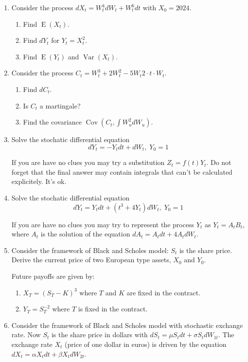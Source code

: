 \documentclass[12pt]{article}
\DeclareMathOperator{\Cov}{Cov}
\DeclareMathOperator{\Var}{Var}
\DeclareMathOperator{\E}{E}
\begin{document}
\begin{enumerate}

\item Consider the process $dX_t = W_t^4 dW_t + W_t^6 dt$ with $X_0 = 2024$.
\begin{enumerate}
  \item Find $\E(X_t)$.
  \item Find $dY_t$ for $Y_t = X_t^2$.
  \item Find $\E(Y_t)$ and $\Var(X_t)$.
\end{enumerate}

\item Consider the process $C_t = W_t^3 + 2W_t^2 - 5 W_t 2 \cdot t\cdot W_t$.
\begin{enumerate}
  \item Find $dC_t$. 
  \item Is $C_t$ a martingale?
  \item Find the covariance $\Cov(C_t, \int W^2_u dW_u)$.
\end{enumerate}

\item Solve the stochatic differential equation
\[
dY_t = - Y_t dt + dW_t, \; Y_0 = 1
\]

If you are have no clues you may try a substitution $Z_t = f(t) Y_t$. 
Do not forget that the final answer may contain integrals that can't be calculated explicitely. It's ok.

\item Solve the stochatic differential equation
\[
dY_t = Y_t dt + (t^3 + 4Y_t) dW_t, \; Y_0 = 1
\]

If you are have no clues you may try to represent the process $Y_t$ as $Y_t = A_t B_t$, 
where $A_t$ is the solution of the equation $dA_t = A_t dt + 4A_t dW_t$. 

\item Consider the framework of Black and Scholes model: $S_t$ is the share price. 
Derive the current price of two European type assets, $X_0$ and $Y_0$. 

Future payoffs are given by:
\begin{enumerate}
  \item $X_T = (S_T - K)^3$ where $T$ and $K$ are fixed in the contract.
  \item $Y_T = S_T^{-2}$ where $T$ is fixed in the contract. 
\end{enumerate}

\item Consider the framework of Black and Scholes model with stochastic exchange rate. 
Now $S_t$ is the share price in dollars with $dS_t = \mu S_t dt + \sigma S_t dW_{1t}$.
The exchange rate $X_t$ (price of one dollar in euros) is driven by the equation 
$dX_t = \alpha X_t dt + \beta X_t dW_{2t}$. 


\end{enumerate}
\end{document}
